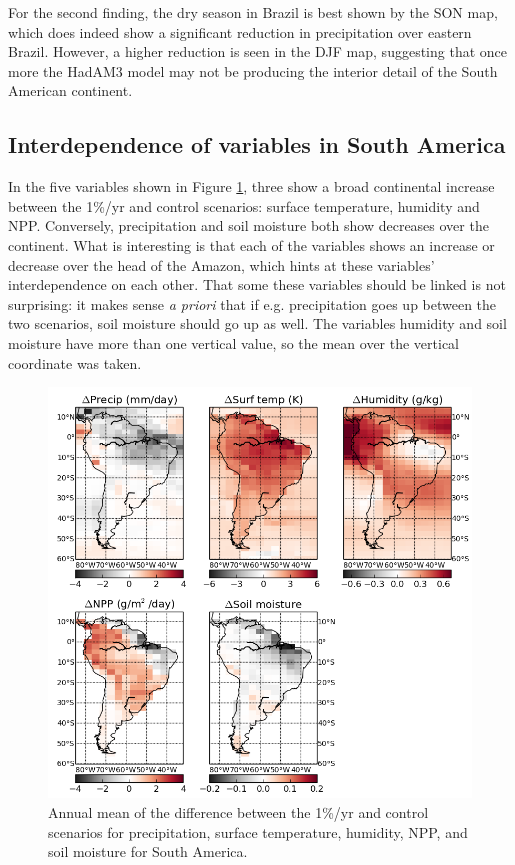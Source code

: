 \documentclass{article}
\begin{document}
For the second finding, the dry season in Brazil is best shown by the SON map, which does indeed show a significant reduction in precipitation over eastern Brazil. However, a higher reduction is seen in the DJF map, suggesting that once more the HadAM3 model may not be producing the interior detail of the South American continent.

\newpage

\subsection{Interdependence of variables in South America}

In the five variables shown in Figure \ref{fig:sa_diff}, three show a broad continental increase between the 1\%/yr and control scenarios: surface temperature, humidity and NPP. Conversely, precipitation and soil moisture both show decreases over the continent. What is interesting is that each of the variables shows an increase or decrease over the head of the Amazon, which hints at these variables' interdependence on each other. That some these variables should be linked is not surprising: it makes sense \textit{a priori} that if e.g. precipitation goes up between the two scenarios, soil moisture should go up as well. The variables humidity and soil moisture have more than one vertical value, so the mean over the vertical coordinate was taken.

\begin{figure}[hbp]
    \centering
    \includegraphics[width=\textwidth]{figures/sa_diff}
    \caption{Annual mean of the difference between the 1\%/yr and control scenarios for precipitation, surface temperature, humidity, NPP, and soil moisture for South America.}
    \label{fig:sa_diff}
\end{figure}
\end{document}
